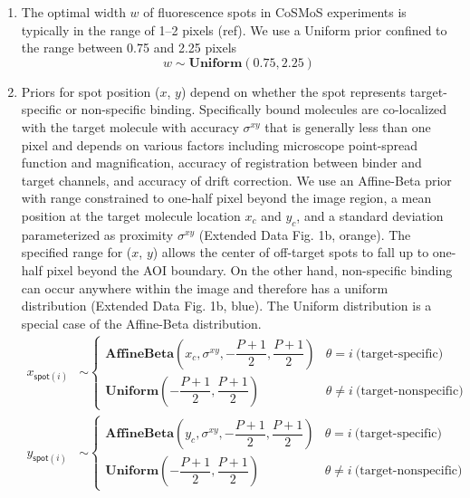 \begin{enumerate}
\item The optimal width $w$ of fluorescence spots in CoSMoS experiments is typically in the range of 1--2 pixels (ref). We use a Uniform prior confined to the range between 0.75 and 2.25 pixels
%
\begin{equation}
    w \sim \textbf{Uniform}(0.75, 2.25)
\end{equation}

\item Priors for spot position ($x$, $y$) depend on whether the spot represents target-specific or non-specific binding. Specifically bound molecules are co-localized with the target molecule with accuracy $\sigma^{xy}$ that is generally less than one pixel and depends on various factors including microscope point-spread function and magnification, accuracy of registration between binder and target channels, and accuracy of drift correction. We use an Affine-Beta prior with range constrained to one-half pixel beyond the image region, a mean position at the target molecule location $x_c$ and $y_c$, and a standard deviation parameterized as proximity $\sigma^{xy}$ (Extended Data Fig. 1b, orange). The specified range for ($x$, $y$) allows the center of off-target spots to fall up to one-half pixel beyond the AOI boundary. On the other hand, non-specific binding can occur anywhere within the image and therefore has a uniform distribution (Extended Data Fig. 1b, blue). The Uniform distribution is a special case of the Affine-Beta distribution.
%
\begin{subequations}
\begin{align}
    x_{\mathsf{spot}(i)} &\sim
    \begin{cases}
        \mathbf{AffineBeta}\left( x_c, \sigma^{xy}, -\dfrac{P+1}{2}, \dfrac{P+1}{2} \right) & \theta = i ~\textrm{(target-specific)} \\
        \mathbf{Uniform}\left(-\dfrac{P+1}{2}, \dfrac{P+1}{2} \right) & \theta \neq i ~\text{(target-nonspecific)}
    \end{cases} \\
    y_{\mathsf{spot}(i)} &\sim
    \begin{cases}
        \mathbf{AffineBeta}\left( y_c, \sigma^{xy}, -\dfrac{P+1}{2}, \dfrac{P+1}{2} \right) & \theta = i ~\textrm{(target-specific)} \\
        \mathbf{Uniform}\left(-\dfrac{P+1}{2}, \dfrac{P+1}{2} \right) & \theta \neq i ~\text{(target-nonspecific)}
    \end{cases}
\end{align}
\end{subequations}


\end{enumerate}

